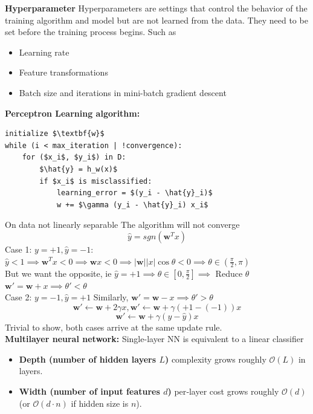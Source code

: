 \documentclass[8pt,twocolumn]{article}
\begin{document}
\textbf{Hyperparameter}
Hyperparameters are settings that control the behavior of the training algorithm and model but are not learned from the data. They need to be set before the training process begins. Such as \vspace{-0.6em}
\begin{itemize}
    \setlength{\itemsep}{0pt}
    \setlength{\parskip}{0pt}
    \item Learning rate
    \item Feature transformations
    \item Batch size and iterations in mini-batch gradient descent
\end{itemize}\vspace{-0.6em}
\textbf{Perceptron Learning algorithm:}\vspace{-0.6em}
\begin{lstlisting}[mathescape = true]
initialize $\textbf{w}$
while (i < max_iteration | !convergence):
    for ($x_i$, $y_i$) in D:
        $\hat{y} = h_w(x)$
        if $x_i$ is misclassified:
            learning_error = $(y_i - \hat{y}_i)$
            w += $\gamma (y_i - \hat{y}_i) x_i$
\end{lstlisting}\vspace{-0.6em}
On data not linearly separable The algorithm will not converge
    \[\hat{y} = sgn(\textbf{w}^Tx)\]
Case 1: $y = +1, \hat{y} = -1$: $\hat{y} < 1 \implies \textbf{w}^Tx < 0 \implies \textbf{w}x < 0 \implies |\textbf{w}||x|\cos\theta < 0 \implies \theta \in (\frac{\pi}{2}, \pi)$\\
\indent But we want the opposite, ie $\hat{y} = +1 \implies \theta \in [0, \frac{\pi}{2}] \implies$ Reduce $\theta$\\
\indent $\textbf{w}' = \textbf{w} + x \implies \theta' < \theta$ \\
Case 2: $y = -1, \hat{y} = +1$ Similarly, $\textbf{w}' = \textbf{w} - x \implies \theta' > \theta$\\
\[\textbf{w}' \leftarrow \textbf{w} + 2\gamma x, \textbf{w}' \leftarrow \textbf{w} + \gamma(+1 - (-1)) x \]
\[\textbf{w}' \leftarrow \textbf{w} + \gamma(y - \hat{y}) x \]
Trivial to show, both cases arrive at the same update rule.\\
\textbf{Multilayer neural network:}
Single-layer NN is equivalent to a linear classifier\vspace{-0.6em}
\begin{itemize}
    \setlength{\itemsep}{0pt}
    \setlength{\parskip}{0pt}
    \item \textbf{Depth (number of hidden layers $L$)} complexity grows roughly $\mathcal{O}(L)$ in layers.
    \item \textbf{Width (number of input features $d$)} per‐layer cost grows roughly $\mathcal{O}(d)$ (or $\mathcal{O}(d\cdot n)$ if hidden size is $n$).
  \end{itemize}\vspace{-0.6em}
\end{document}
